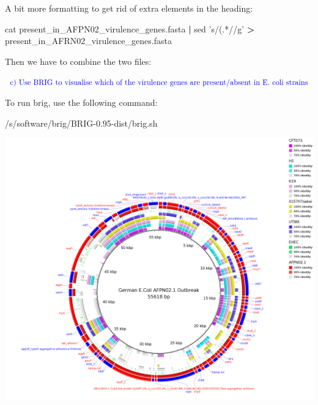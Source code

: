 \documentclass[12pt,]{article}
\newenvironment{Shaded}{\begin{snugshade}}{\end{snugshade}}
\newcommand{\KeywordTok}[1]{\textcolor[rgb]{0.13,0.29,0.53}{\textbf{#1}}}
\newcommand{\StringTok}[1]{\textcolor[rgb]{0.31,0.60,0.02}{#1}}
\newcommand{\FunctionTok}[1]{\textcolor[rgb]{0.00,0.00,0.00}{#1}}
\newcommand{\VariableTok}[1]{\textcolor[rgb]{0.00,0.00,0.00}{#1}}
\newcommand{\OperatorTok}[1]{\textcolor[rgb]{0.81,0.36,0.00}{\textbf{#1}}}
\newcommand{\ExtensionTok}[1]{#1}
\newcommand{\NormalTok}[1]{#1}
\begin{document}
A bit more formatting to get rid of extra elements in the heading:

\begin{Shaded}
\begin{Highlighting}[]
\FunctionTok{cat}\NormalTok{ present_in_AFPN02_virulence_genes.fasta }\KeywordTok{|} \FunctionTok{sed} \StringTok{'s/(.*//g'} 
\OperatorTok{>} \ExtensionTok{present_in_AFRN02_virulence_genes.fasta}
\end{Highlighting}
\end{Shaded}

Then we have to combine the two files:

\begin{Shaded}
\end{Shaded}

\(\color{blue}{\text{c) Use BRIG to visualise which of the virulence genes are present/absent in E. coli strains}}\)

To run brig, use the following command:

\begin{Shaded}
\begin{Highlighting}[]
\ExtensionTok{/s/software/brig/BRIG-0.95-dist/brig.sh}
\end{Highlighting}
\end{Shaded}

\includegraphics{final_comparison_virulence.fasta.png}
\end{document}
